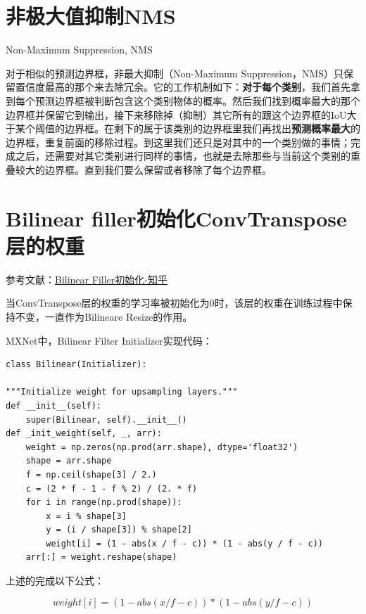 \section{非极大值抑制NMS}

Non-Maximum Suppression, NMS

对于相似的预测边界框，非最大抑制（Non-Maximum Suppression，NMS）只保留置信度最高的那个来去除冗余。它的工作机制如下：\textbf{对于每个类别}，我们首先拿到每个预测边界框被判断包含这个类别物体的概率。然后我们找到概率最大的那个边界框并保留它到输出，接下来移除掉（抑制）其它所有的跟这个边界框的IoU大于某个阈值的边界框。在剩下的属于该类别的边界框里我们再找出\textbf{预测概率最大}的边界框，重复前面的移除过程。到这里我们还只是对其中的一个类别做的事情；完成之后，还需要对其它类别进行同样的事情，也就是去除那些与当前这个类别的重叠较大的边界框。直到我们要么保留或者移除了每个边界框。

\section{Bilinear filler初始化ConvTranspose层的权重}

参考文献：\href{https://www.zhihu.com/search?type=content&q=Transpose%20Convolution%20%E5%88%9D%E5%A7%8B%E5%8C%96}{Bilinear Filler初始化-知乎}

当ConvTranspose层的权重的学习率被初始化为0时，该层的权重在训练过程中保持不变，一直作为Bilineare Resize的作用。

MXNet中，Bilinear Filter Initializer实现代码：


\begin{lstlisting}
class Bilinear(Initializer):

"""Initialize weight for upsampling layers."""
def __init__(self):
    super(Bilinear, self).__init__()
def _init_weight(self, _, arr):
    weight = np.zeros(np.prod(arr.shape), dtype='float32')
    shape = arr.shape
    f = np.ceil(shape[3] / 2.)
    c = (2 * f - 1 - f % 2) / (2. * f)
    for i in range(np.prod(shape)):
        x = i % shape[3]
        y = (i / shape[3]) % shape[2]
        weight[i] = (1 - abs(x / f - c)) * (1 - abs(y / f - c))
    arr[:] = weight.reshape(shape)
\end{lstlisting}

上述的完成以下公式：

\begin{displaymath}
weight[i] = (1 - abs(x / f - c)) * (1 - abs(y / f - c)) 
\end{displaymath}

